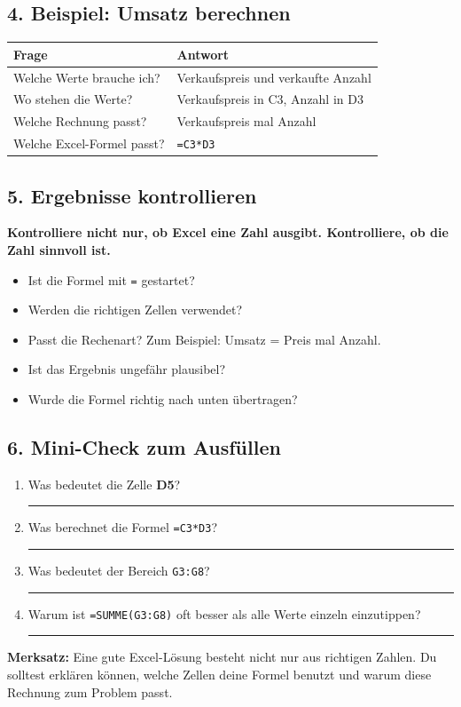 \subsection*{4. Beispiel: Umsatz berechnen}
\begin{tabularx}{\textwidth}{|>{\raggedright\arraybackslash}p{5.2cm}|>{\raggedright\arraybackslash}X|}
\hline
\rowcolor{gray!20}\textbf{Frage} & \textbf{Antwort} \\\hline
Welche Werte brauche ich? & Verkaufspreis und verkaufte Anzahl \\\hline
Wo stehen die Werte? & Verkaufspreis in C3, Anzahl in D3 \\\hline
Welche Rechnung passt? & Verkaufspreis mal Anzahl \\\hline
Welche Excel-Formel passt? & \texttt{=C3*D3} \\\hline
\end{tabularx}

\subsection*{5. Ergebnisse kontrollieren}
\begin{boxK}
\textbf{Kontrolliere nicht nur, ob Excel eine Zahl ausgibt. Kontrolliere, ob die Zahl sinnvoll ist.}
\end{boxK}

\begin{itemize}
  \item Ist die Formel mit \texttt{=} gestartet?
  \item Werden die richtigen Zellen verwendet?
  \item Passt die Rechenart? Zum Beispiel: Umsatz = Preis mal Anzahl.
  \item Ist das Ergebnis ungefähr plausibel?
  \item Wurde die Formel richtig nach unten übertragen?
\end{itemize}

\subsection*{6. Mini-Check zum Ausfüllen}
\begin{enumerate}[label=\alph*)]
  \item Was bedeutet die Zelle \textbf{D5}?\\[0.6cm]
  \rule{\textwidth}{0.4pt}

  \item Was berechnet die Formel \texttt{=C3*D3}?\\[0.6cm]
  \rule{\textwidth}{0.4pt}

  \item Was bedeutet der Bereich \texttt{G3:G8}?\\[0.6cm]
  \rule{\textwidth}{0.4pt}

  \item Warum ist \texttt{=SUMME(G3:G8)} oft besser als alle Werte einzeln einzutippen?\\[0.6cm]
  \rule{\textwidth}{0.4pt}
\end{enumerate}

\begin{boxK}
\textbf{Merksatz:} Eine gute Excel-Lösung besteht nicht nur aus richtigen Zahlen. Du solltest erklären können, welche Zellen deine Formel benutzt und warum diese Rechnung zum Problem passt.
\end{boxK}
